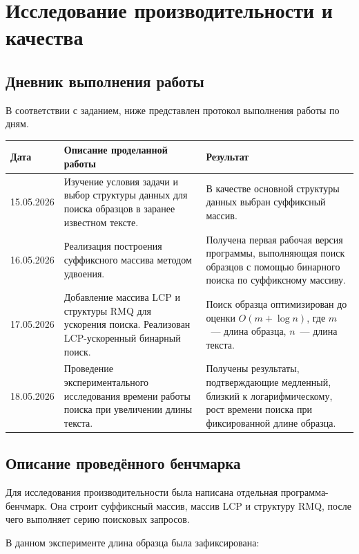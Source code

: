 \section{Исследование производительности и качества}

\subsection{Дневник выполнения работы}

В соответствии с заданием, ниже представлен протокол выполнения работы по дням.

\begin{center}
\begin{tabular}{|p{3cm}|p{7cm}|p{4cm}|}
\hline
\textbf{Дата} & \textbf{Описание проделанной работы} & \textbf{Результат} \\ \hline
15.05.2026 & Изучение условия задачи и выбор структуры данных для поиска образцов в заранее известном тексте. & В качестве основной структуры данных выбран суффиксный массив. \\ \hline
16.05.2026 & Реализация построения суффиксного массива методом удвоения. & Получена первая рабочая версия программы, выполняющая поиск образцов с помощью бинарного поиска по суффиксному массиву. \\ \hline
17.05.2026 & Добавление массива LCP и структуры RMQ для ускорения поиска. Реализован LCP-ускоренный бинарный поиск. & Поиск образца оптимизирован до оценки \(O(m + \log n)\), где \(m\)~--- длина образца, \(n\)~--- длина текста. \\ \hline
18.05.2026 & Проведение экспериментального исследования времени работы поиска при увеличении длины текста. & Получены результаты, подтверждающие медленный, близкий к логарифмическому, рост времени поиска при фиксированной длине образца. \\ \hline
\end{tabular}
\end{center}

\subsection{Описание проведённого бенчмарка}

Для исследования производительности была написана отдельная программа-бенчмарк. 
Она строит суффиксный массив, массив LCP и структуру RMQ, после чего выполняет серию поисковых запросов.

В данном эксперименте длина образца была зафиксирована:

